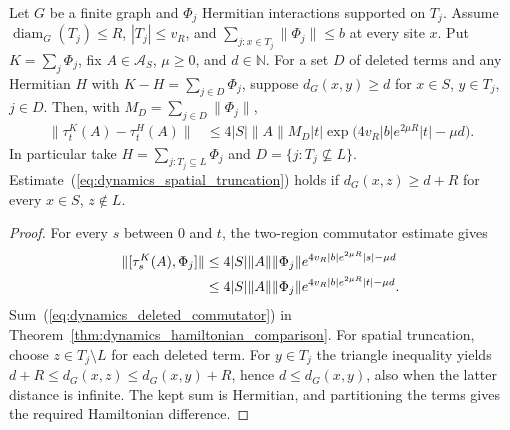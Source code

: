 \begin{theorem}
    \label{thm:dynamics_spatial_truncation}
    \leanok
    Let $G$ be a finite graph and $\Phi_j$ Hermitian interactions supported
    on $T_j$. Assume $\operatorname{diam}_G(T_j)\leq R$, $|T_j|\leq v_R$,
    and $\sum_{j:x\in T_j}\|\Phi_j\|\leq b$ at every site $x$.
    Put $K=\sum_j\Phi_j$, fix $A\in\mathcal A_S$, $\mu\geq0$, and $d\in\mathbb N$.
    For a set $D$ of deleted terms and any Hermitian $H$ with
    $K-H=\sum_{j\in D}\Phi_j$, suppose $d_G(x,y)\geq d$ for
    $x\in S$, $y\in T_j$, $j\in D$. Then, with $M_D=\sum_{j\in D}\|\Phi_j\|$,
    \begin{align}
        \label{eq:dynamics_spatial_truncation}
        \|\tau^K_t(A)-\tau^H_t(A)\|
        &\leq4|S|\|A\|M_D|t|
        \exp\bigl(4v_R|b|e^{2\mu R}|t|-\mu d\bigr).
    \end{align}
    In particular take $H=\sum_{j:T_j\subseteq L}\Phi_j$ and
    $D=\{j:T_j\not\subseteq L\}$. Estimate~(\ref{eq:dynamics_spatial_truncation}) holds if
    $d_G(x,z)\geq d+R$ for every $x\in S$, $z\notin L$.
\end{theorem}
\begin{proof}\leanok
    For every $s$ between $0$ and $t$, the two-region commutator estimate gives
    \begin{align}
        \label{eq:dynamics_deleted_commutator}
        \|[\tau^K_s(A),\Phi_j]\|
        &\leq4|S|\|A\|\|\Phi_j\|
        e^{4v_R|b|e^{2\mu R}|s|-\mu d}\notag\\
        &\leq4|S|\|A\|\|\Phi_j\|
        e^{4v_R|b|e^{2\mu R}|t|-\mu d}.
    \end{align}
    Sum~(\ref{eq:dynamics_deleted_commutator}) in
    Theorem~\ref{thm:dynamics_hamiltonian_comparison}.
    For spatial truncation, choose $z\in T_j\setminus L$ for each deleted term.
    For $y\in T_j$ the triangle inequality yields
    $d+R\leq d_G(x,z)\leq d_G(x,y)+R$, hence $d\leq d_G(x,y)$,
    also when the latter distance is infinite. The kept sum is Hermitian,
    and partitioning the terms gives the required Hamiltonian difference.
\end{proof}

